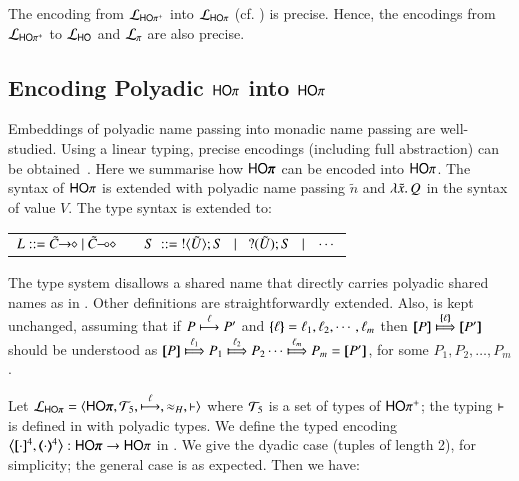 \smallskip 

\begin{theorem}
\label{f:enc:hopiptohopi}
The encoding from $\mathcal{L}_{\mathsf{HO\pi^{+}}}$ into $\mathcal{L}_{\mathsf{HO}\pi}$ (cf. )
is precise. Hence, the encodings 
from $\mathcal{L}_{\mathsf{HO\pi^{+}}}$ to $\mathcal{L}_{\mathsf{HO}}$ 
and $\mathcal{L}_{\pi}$ 
are also precise. 
\end{theorem}
\smallskip 



\subsection{Encoding Polyadic $\mathsf{HO}\pi$ into $\mathsf{HO}\pi$}
\label{subsec:pho}
\noi Embeddings of polyadic name passing into monadic name passing are
well-studied. %
Using a linear typing, precise
encodings (including full abstraction) can be obtained~\cite{Yoshida96}.
Here we summarise how $\PHOp$ can be encoded into $\mathsf{HO}\pi$. 
The syntax of 
$\mathsf{HO}\pi$ is extended %
with
polyadic name passing $\tilde{n}$ and $\lambda \tilde{x}.\,Q$ in the syntax 
of value $V$. The type syntax is extended to: 
%
\begin{center}
\begin{tabular}{c}
$
L ::= \shot{\tilde{C}} \ | \ \lhot{\tilde{C}}
\quad\quad S \ ::= \  \btout{\tilde{U}} S \bnfbar \btinp{\tilde{U}} S \bnfbar \cdots 
$
\end{tabular}
\end{center}
%
The type system disallows a shared name that directly carries polyadic
shared names as in \cite{tlca07,MostrousY15}.
Other definitions are straightforwardly extended. 
Also,  is kept unchanged, 
assuming that if 
$P \stackrel{\ell}{\longmapsto} P'$ and $\{\!\!\{\ell\}\!\!\} = \ell_1, \ell_2,  \cdots, \ell_m$ then
$\map{P} \Hby{\mapa{\ell}} \map{P'}$
should be understood as
$\map{P} \Hby{\ell_1} P_1 \Hby{\ell_2} P_2 \cdots \Hby{\ell_m} P_m =  \map{P'}$,
for some
$P_1, P_2, \ldots, P_m$.

Let $\tyl{L}_{\PHOp}=\calc{\PHOp}{{\cal{T}}_5}{\hby{\ell}}{\wb_H}{\proves}$
where 
${\cal{T}}_5$ is a set of types of $\mathsf{HO\pi^{+}}$;  
the typing $\vdash$ is defined in 
 with polyadic types. 
We define %
the typed encoding $\enco{\map{\cdot}^{4}, \mapt{\cdot}^{4} %
}: \PHOp \to \HOp$ 
in . We give the dyadic case (tuples of length 2), for simplicity;
the general case is as expected.
Then we have:

